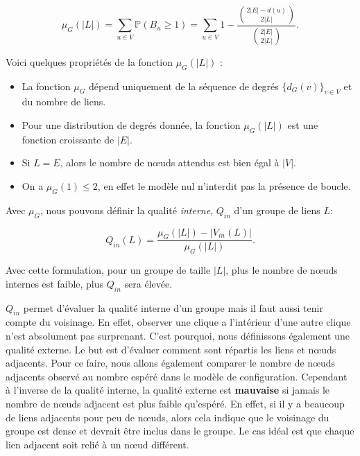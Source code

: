 \begin{equation}
\label{eq:nbsommet_esp} \mu_{G}(|L|) = \sum_{u\in V} \mathbb{P}( B_u \geq 1 )
=  \sum_{u \in V} 1 - \dfrac{ \binom{2|E|-d(u)}{2|L|} }{ \binom{2|E|}{2|L|} }. 
\end{equation}

Voici quelques propriétés de la fonction $\mu_{G}(|L|)$ :
\begin{itemize}
\item La fonction $\mu_{G}$ dépend uniquement de la séquence de degrés $\{d_G(v)\}_{v \in V}$ et du nombre de liens.
\item Pour une distribution de degrés donnée, la fonction   $\mu_{G}(|L|)$ est une fonction croissante de $|E|$.
\item Si $L=E$, alors le nombre de n\oe uds attendus est bien égal à $|V|$.
\item On a $\mu_{G}(1)\leq 2$, en effet le modèle nul n'interdit pas la présence de boucle.
\end{itemize}

Avec $\mu_G$, nous pouvons définir la qualité \emph{interne}, $Q_{in}$ d'un groupe de liens $L$:
  
\begin{equation}
\label{eq:qin} Q_{in}(L) = \dfrac{\mu_{G}(|L|) - |V_{in}(L)|}{\mu_{G}(|L|)}.
\end{equation}

Avec cette formulation, pour un groupe de taille $|L|$, plus le nombre de n\oe uds internes est faible, plus $Q_{in}$ sera élevée.

$Q_{in}$ permet d'évaluer la qualité interne d'un groupe mais il faut aussi tenir compte du voisinage.
En effet, observer une clique a l'intérieur d'une autre clique n'est absolument pas surprenant.
C'est pourquoi, nous définissons également une qualité externe.
Le but est d'évaluer comment sont répartis les liens et n\oe uds adjacents.
Pour ce faire, nous allons également comparer le nombre de n\oe uds adjacents observé au nombre espéré dans le modèle de configuration.
Cependant à l'inverse de la qualité interne, la qualité externe est \textbf{mauvaise} si jamais le nombre de n\oe uds adjacent est plus faible qu'espéré.
En effet, si il y a beaucoup de liens adjacents pour peu de n\oe uds, alors cela indique que le voisinage du groupe est dense et devrait être inclus dans le groupe.
Le cas idéal est que chaque lien adjacent soit relié à un n\oe ud différent.

